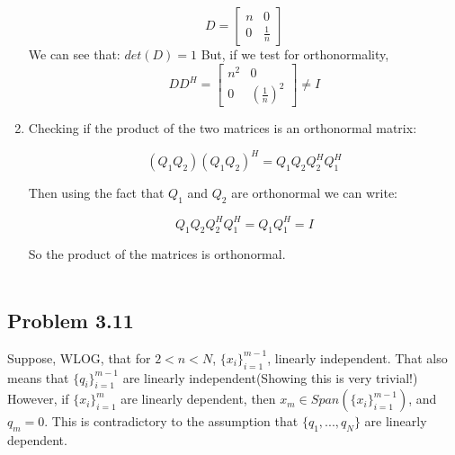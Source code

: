 \documentclass[letterpaper,12pt]{article}
\theoremstyle{definition}
\begin{document}
\begin{spacing}{1.3}{}
\begin{enumerate}
	\[D =
	\begin{bmatrix}
	n & 0 \\
	0 & \frac{1}{n}
	\end{bmatrix}
	\]
	We can see that:
	$det(D) = 1$
	But, if we test for orthonormality,
	\[DD^{H} =
	\begin{bmatrix}
	n^2 & 0 \\
	0 & (\frac{1}{n})^{2}
	\end{bmatrix} \neq I
	\]
	
	\item
	
	Checking if the product of the two matrices is an orthonormal matrix:
	
	$$(Q_1Q_2)(Q_1Q_2)^H = Q_1Q_2Q_2^HQ_1^H$$
	
	Then using the fact that $Q_1$ and $Q_2$ are orthonormal we can write:
	
	$$Q_1Q_2Q_2^HQ_1^H = Q_1Q_1^H = I$$
	
	So the product of the matrices is orthonormal. \\\\
	
\end{enumerate}	


\subsection*{Problem 3.11}
	
	Suppose, WLOG, that for $2 < n < N$, $\{x_i \}_{i=1}^{m-1}$, linearly independent. That also means that $\{q_i\}_{i=1}^{m-1} $ are linearly independent(Showing this is very trivial!) \\
	However, if $\{x_i \}_{i=1}^{m}$ are linearly dependent, then $x_m \in Span(\{x_i \}_{i=1}^{m-1})$, and $q_m = 0$. This is contradictory to the assumption that $\{q_1, ..., q_N\}$ are linearly dependent.
	

\end{spacing}
\end{document}
